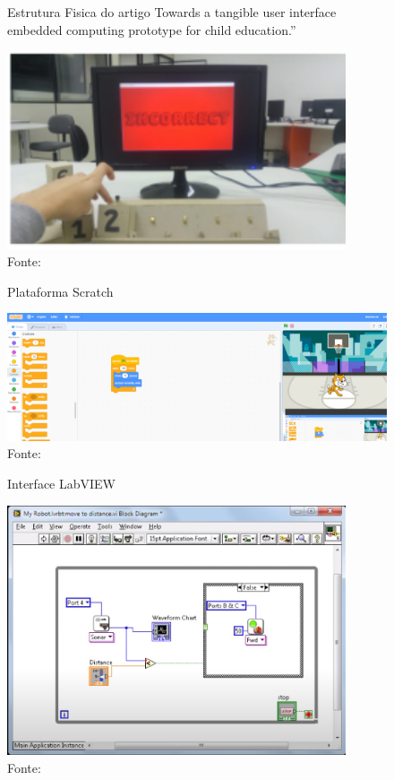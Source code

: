 \begin{figure}[h!]
    \centering
    \caption{Estrutura Fisica do artigo Towards a tangible user interface embedded computing prototype for child education.”}
    \includegraphics[width=10cm]{images/cap2/estrutura_artigo_towards.png}
    \caption*{Fonte:}
    \label{figura:estrutura_artigo_towards}
\end{figure}

\begin{figure}[h!]
    \centering
    \caption{Plataforma Scratch}
    \includegraphics[width=15cm]{images/cap2/scratch.png}
    \caption*{Fonte:}
    \label{figura:scratch}
\end{figure}

\begin{figure}[h!]
    \centering
    \caption{Interface LabVIEW}
    \includegraphics[width=10cm]{images/cap2/labview.png}
    \caption*{Fonte:}
    \label{figura:labview}
\end{figure}


